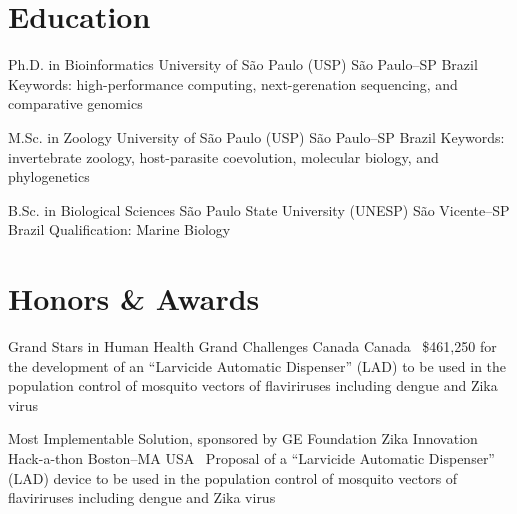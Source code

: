\documentclass[11pt, letterpaper, sans]{moderncv}
\begin{document}


\restoregeometry

\clearpage


\section{Education}

		{Ph.D. in Bioinformatics}
		{University of São Paulo (USP)}
		{São Paulo--SP}
		{Brazil}
		{Keywords: high-performance computing, next-gerenation sequencing, and comparative genomics}

		{M.Sc. in Zoology}
		{University of São Paulo (USP)}
		{São Paulo--SP}
		{Brazil}
		{Keywords: invertebrate zoology, host-parasite coevolution, molecular biology, and phylogenetics}

		{B.Sc. in Biological Sciences}
		{São Paulo State University (UNESP)}
		{São Vicente--SP}
		{Brazil}
		{Qualification: Marine Biology}


\section{Honors \& Awards}

	{Grand Stars in Human Health}
	{Grand Challenges Canada}
	{Canada}
	{}
	{\textbullet~\$461,250 for the development of an ``Larvicide Automatic Dispenser'' (LAD) to be used in the population control of mosquito vectors of flaviriruses including dengue and Zika virus}

\cventry{---}
	{Most Implementable Solution, sponsored by GE Foundation}
	{Zika Innovation Hack-a-thon}
	{Boston--MA}
	{USA}
	{\textbullet~Proposal of a ``Larvicide Automatic Dispenser'' (LAD) device to be used in the population control of mosquito vectors of flaviriruses including dengue and Zika virus}
\end{document}

